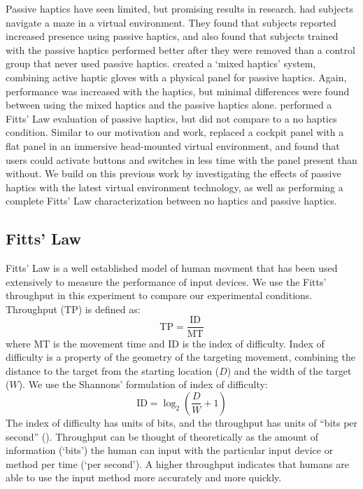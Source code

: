 Passive haptics have seen limited, but promising results in research.
\citet{insko_passive_2001} had subjects navigate a maze in a virtual environment.
They found that subjects reported increased presence using passive haptics, and also found that subjects trained with the passive haptics performed better after they were removed than a control group that never used passive haptics.
\citet{borst_evaluation_2005} created a `mixed haptics' system, combining active haptic gloves with a physical panel for passive haptics.
Again, performance was increased with the haptics, but minimal differences were found between using the mixed haptics and the passive haptics alone.
\citet{kohli_redirected_2012} performed a Fitts' Law evaluation of passive haptics, but did not compare to a no haptics condition.
Similar to our motivation and work, \citet{schiefele_simple_1998} replaced a cockpit panel with a flat panel in an immersive head-mounted virtual environment, and found that users could activate buttons and switches in less time with the panel present than without.
We build on this previous work by investigating the effects of passive haptics with the latest virtual environment technology, as well as performing a complete Fitts' Law characterization between no haptics and passive haptics.

\subsection{Fitts' Law}

Fitts' Law is a well established model of human movment that has been used extensively to measure the performance of input devices.
We use the Fitts' throughput in this experiment to compare our experimental conditions.
Throughput ($\mathrm{TP}$) is defined as:
\begin{equation}
    \mathrm{TP}=\frac{\mathrm{ID}}{\mathrm{MT}}
    \label{eq:throughput}
\end{equation}
where $\mathrm{MT}$ is the movement time and $\mathrm{ID}$ is the index of difficulty.
Index of difficulty is a property of the geometry of the targeting movement, combining the distance to the target from the starting location ($D$) and the width of the target ($W$).
We use the Shannons' formulation of index of difficulty:
\begin{equation}
    \mathrm{ID}=\log_2\left(\frac{D}{W}+1\right)
\end{equation}
The index of difficulty has units of bits, and the throughput has units of ``bits per second'' (\si{\bps}).
Throughput can be thought of theoretically as the amount of information (`bits') the human can input with the particular input device or method per time (`per second').
A higher throughput indicates that humans are able to use the input method more accurately and more quickly.

